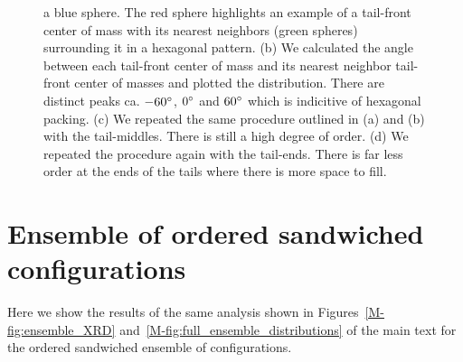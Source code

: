 \documentclass{article}
\begin{document}
\begin{figure}[!htb]
{        a blue sphere. The red sphere highlights an example of a tail-front 
        center of mass with its nearest neighbors (green spheres) surrounding it
        in a hexagonal pattern. (b) We calculated the angle between each tail-front
        center of mass and its nearest neighbor tail-front center of masses and 
        plotted the distribution. There are distinct peaks ca. $-60\degree$, $0\degree$ and
        $60\degree$ which is indicitive of hexagonal packing. (c) We repeated the 
        same procedure outlined in (a) and (b) with the tail-middles. There is still 
        a high degree of order. (d) We repeated the procedure again with the tail-ends.
        There is far less order at the ends of the tails where there is more
        space to fill.}\label{fig:tail_packing}
  \end{figure}
  
  \clearpage
  
  \section{Ensemble of ordered sandwiched configurations}
  
  Here we show the results of the same analysis shown in Figures~\ref{M-fig:ensemble_XRD} 
  and~\ref{M-fig:full_ensemble_distributions} of the main text for the 
  ordered sandwiched ensemble of configurations.
  
\end{document}
